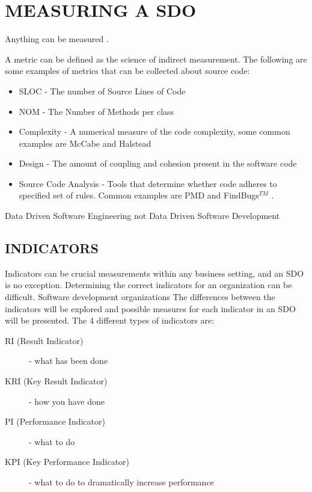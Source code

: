 \documentclass[SDSUThesis.tex]{subfiles}
\begin{document}
\section{MEASURING A SDO}

Anything can be measured \cite{Hubbard2010}.

A metric can be defined as the science of indirect measurement.
    The following are some examples of metrics that can be collected 
    about source code:
    \begin{itemize}
        \item SLOC - The number of Source Lines of Code 
        \item NOM - The Number of Methods per class
        \item Complexity - A numerical measure of the code complexity,
            some common examples are McCabe \cite{McCabe1976} and 
            Halstead \cite{Halstead1977}
        \item Design - The amount of coupling and cohesion present 
        in the software code
        \item Source Code Analysis - Tools that determine whether 
        code adheres to specified set of rules. Common 
        examples are PMD and FindBugs$^{TM}$ \cite{PMD, Findbugs}.
    \end{itemize}

Data Driven Software Engineering not Data Driven Software Development

\subsection{INDICATORS}
Indicators can be crucial measurements
within any business setting, and an SDO is no exception. Determining
the correct indicators for an organization can
be difficult.  Software development organizations
The differences between the indicators will be explored and
possible measures for each indicator in an SDO will be
presented.  The 4 different types of indicators are:
\begin{description}
  \item[RI (Result Indicator)] - what has been done
  \item[KRI (Key Result Indicator)] - how you have done
  \item[PI (Performance Indicator)] - what to do
  \item[KPI (Key Performance Indicator)] - what to do to dramatically increase performance
\end{description}
\end{document}
